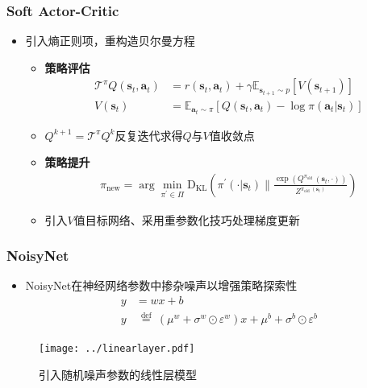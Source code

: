 \documentclass{beamer}
\begin{document}
\begin{CJK*}{GBK}{hei}
\begin{frame}\frametitle{Soft Actor-Critic}
\begin{itemize}
\item \citep{Haarnoja2018SoftAO}引入熵正则项，重构造贝尔曼方程
{
\begin{itemize}
\item \textbf{策略评估}
        \begin{align*}
            \mathcal{T}^{\pi} Q\left(\mathbf{s}_{t}, \mathbf{a}_{t}\right) &= r\left(\mathbf{s}_{t}, \mathbf{a}_{t}\right)+\gamma \mathbb{E}_{\mathbf{s}_{t+1} \sim p}\left[V\left(\mathbf{s}_{t+1}\right)\right]\\
            V\left(\mathbf{s}_{t}\right)&=\mathbb{E}_{\mathbf{a}_{t} \sim \pi}\left[Q\left(\mathbf{s}_{t}, \mathbf{a}_{t}\right)-\log \pi\left(\mathbf{a}_{t} \vert \mathbf{s}_{t}\right)\right]
        \end{align*}
\item $Q^{k+1}=\mathcal{T}^{\pi} Q^{k}$反复迭代求得$Q$与$V$值收敛点
\item \textbf{策略提升}
\begin{align*}
            \pi_{\mathrm{new}}=\arg \min _{\pi^{\prime} \in \Pi} \mathrm{D}_{\mathrm{KL}}\left(\pi^{\prime}\left(\cdot \vert \mathbf{s}_{t}\right) \| \frac{\exp \left(Q^{\pi_{\text {old }}}\left(\mathbf{s}_{t}, \cdot\right)\right)}{Z^{\pi_{\text {old }}\left(\mathbf{s}_{t}\right)}}\right)
\end{align*}
\item 引入$V$值目标网络、采用重参数化技巧处理梯度更新
\end{itemize}
}
\end{itemize}
\end{frame}

\begin{frame}\frametitle{NoisyNet}
\begin{itemize}
\item NoisyNet\citep{Fortunato2018NoisyNF}在神经网络参数中掺杂噪声以增强策略探索性
\begin{align*}
    y&=w x+b\\
    y &\stackrel{\text { def }}{=}\left(\mu^{w}+\sigma^{w} \odot \varepsilon^{w}\right) x+\mu^{b}+\sigma^{b} \odot \varepsilon^{b}
\end{align*}
\end{itemize}
\begin{figure}[htbp]
    \centering\texttt{[image: ../linearlayer.pdf]}
	\caption{引入随机噪声参数的线性层模型}
\end{figure}
\end{frame}


\end{CJK*}
\end{document}

